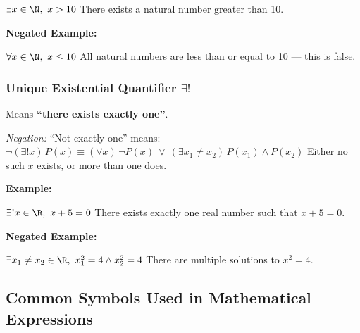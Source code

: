 \(\exists x \in \N,\ x > 10\) There exists a natural number greater than 10.
			
\textbf{Negated Example:}  

\(\forall x \in \N,\ x \leq 10\) All natural numbers are less than or equal to 10 — this is false.

\subsubsection{Unique Existential Quantifier \texorpdfstring{\(\exists ! \)}{}} 
	
Means \textbf{``there exists exactly one''}.
		
\emph{Negation:} ``Not exactly one'' means:
\(\neg (\exists! x)\, P(x) \equiv (\forall x)\, \neg P(x)\ \lor\ (\exists x_1 \neq x_2)\, P(x_1) \land 
P(x_2)\) Either no such \(x\) exists, or more than one does.

\textbf{Example:} 

\(\exists! x \in \R,\ x + 5 = 0\) There exists exactly one real number such that \( x + 5 = 0 \).

\textbf{Negated Example:}  

\(\exists x_1 \neq x_2 \in \R,\ x_1^2 = 4 \land x_2^2 = 4\) There are multiple solutions to 
\( x^2 = 4 \).

\subsection{Common Symbols Used in Mathematical Expressions}

